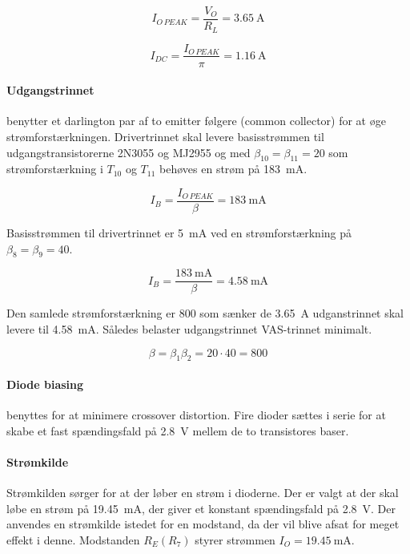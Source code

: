 \documentclass[danish]{article}
\begin{document}
\begin{equation}
I_{O\,PEAK} = \dfrac{V_O}{R_L} = \SI{3.65}{\ampere}
\end{equation}

\begin{equation}
I_{DC} = \dfrac{I_{O\,PEAK}}{\pi} = \SI{1.16}{\ampere}
\end{equation}

\paragraph{Udgangstrinnet} benytter et darlington par af to emitter følgere (common collector) for at øge strømforstærkningen. Drivertrinnet skal levere basisstrømmen til udgangstransistorerne 2N3055 og MJ2955 og med $\beta_{10} = \beta_{11} = 20$ som strømforstærkning i $T_{10}$ og $T_{11}$ behøves en strøm på \SI{183}{\milli\ampere}.

\begin{equation}
I_B = \dfrac{I_{O\,PEAK}}{\beta} = \SI{183}{\milli\ampere}
\end{equation}

Basisstrømmen til drivertrinnet er \SI{5}{\milli\ampere} ved en strømforstærkning på $\beta_8 = \beta_9 = 40$.

\begin{equation}
I_B = \dfrac{\SI{183}{\milli\ampere}}{\beta} = \SI{4.58}{\milli\ampere}
\end{equation}

Den samlede strømforstærkning er 800 som sænker de \SI{3.65}{\ampere} udganstrinnet skal levere til \SI{4.58}{\milli\ampere}. Således belaster udgangstrinnet VAS-trinnet minimalt.

\begin{equation}
\beta = \beta_1 \beta_2 = 20 {\cdot} 40 = 800
\end{equation}

\newpage
\paragraph{Diode biasing} benyttes for at minimere crossover distortion. Fire dioder sættes i serie for at skabe et fast spændingsfald på \SI{2.8}{\volt} mellem de to transistores baser. 

\paragraph{Strømkilde}
Strømkilden sørger for at der løber en strøm i dioderne. 
Der er valgt at der skal løbe en strøm på \SI{19.45}{\milli\ampere}, der giver et konstant spændingsfald på \SI{2.8}{\volt}. 
Der anvendes en strømkilde istedet for en modstand, da der vil blive afsat for meget effekt i denne.
Modstanden $R_E (R_{7})$ styrer strømmen $I_O = \SI{19.45}{\milli\ampere}$. 
\end{document}
